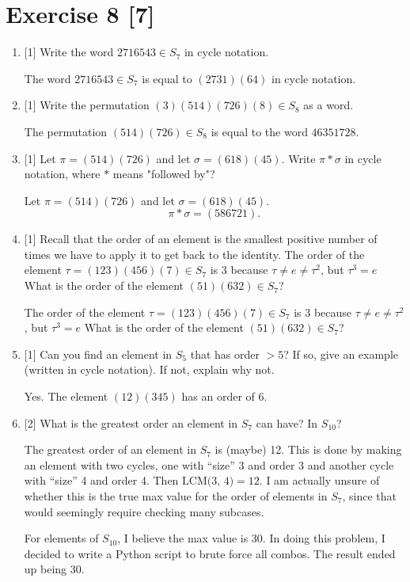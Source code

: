 \documentclass{article}
\begin{document}
\section*{Exercise 8 [7]} 
\begin{enumerate}
    \item { 
        [1]
    Write the word \(2716543 \in S_7\) in cycle notation.

        The word \(2716543 \in S_7\) is equal to \((2731)(64)\) in cycle notation.
    }
    \item {
        [1] Write the permutation \((3)(514)(726)(8) \in S_8\) as a word.

        The permutation \((514)(726) \in S_8\) is equal to the word \(46351728\).
    }
    \item {
        [1] Let \(\pi = (514)(726)\) and let \(\sigma = (618)(45)\). 
        Write \(\pi * \sigma\) in cycle notation, where \(*\) means "followed by"?

        Let \(\pi = (514)(726)\) and let \(\sigma = (618)(45)\). 
        \[\pi * \sigma = (586721).\]
    }
    \item {
    [1]
    Recall that the order of an element is the smallest positive number of times we have to apply it to get back to the identity.
    The order of the element \(\tau = (123)(456)(7) \in S_7\) is \(3\) because \(\tau \neq e \neq \tau^2\), but \(\tau^3 = e\)
    What is the order of the element \((51)(632) \in S_7\)?
    
    The order of the element \(\tau = (123)(456)(7) \in S_7\) is \(3\) because \(\tau \neq e \neq \tau^2\), but \(\tau^3 = e\)
    What is the order of the element \((51)(632) \in S_7\)?
    }
    \item {
        [1]
    Can you find an element in \(S_5\) that has order \(>5\)? If so, give an example (written in cycle notation). If not, explain why not.

    Yes. The element \((12)(345)\) has an order of 6.
    }
    \item {
        [2]
        What is the greatest order an element in \(S_7\) can have? In \(S_{10}\)?

        The greatest order of an element in \(S_7\) is (maybe) 12. This is done 
        by making an element with two cycles, one with ``size'' 3 and order 3 and 
        another cycle with ``size'' 4 and order 4. Then \(\text{LCM(3, 4)} = 12\).
        I am actually unsure of whether this is the true max value for the order 
        of elements in \(S_7\), since that would seemingly require checking many
        subcases.

        For elements of \(S_{10}\), I believe the max value is 30. In doing this 
        problem, I decided to write a Python script to brute force all combos.
        The result ended up being 30.

        
    }
\end{enumerate}
\end{document}
